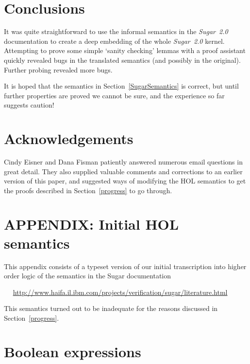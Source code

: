 \documentclass{llncs}
\newcommand\Sugar{{\it{Sugar~2.0}}\xspace}
\begin{document}
\section{Conclusions}

It was quite straightforward to use the informal semantics in the
\Sugar documentation to create a deep embedding of the whole \Sugar
kernel.  Attempting to prove some simple `sanity checking' lemmas with
a proof assistant quickly revealed bugs in the translated semantics (and
possibly in the original). Further probing revealed more bugs.

It is hoped that the
semantics in Section~\ref{SugarSemantics} is correct, but until
further properties are proved we cannot be sure, and the experience so
far suggests caution!


\section{Acknowledgements}

Cindy Eisner and Dana Fisman patiently answered numerous email questions
in great detail. They also supplied valuable comments and corrections
to an earlier version of this paper, and suggested
ways of modifying the HOL semantics to get the proofs described in Section~\ref{progress} to go through.

{}

\newpage
\section*{APPENDIX: Initial HOL semantics}\label{appendix}


This appendix consists of a typeset version of our initial transcription into higher order logic of
the semantics in the Sugar documentation

~~{\footnotesize
\url{http://www.haifa.il.ibm.com/projects/verification/sugar/literature.html}}

This semantics turned out to be inadequate for the reasons discussed in Section~\ref{progress}.

\section{Boolean expressions}
\end{document}
